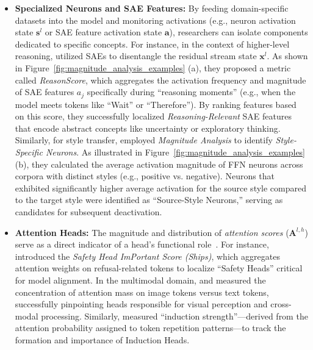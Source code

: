 \documentclass[11pt,letterpaper]{mystyle}
\begin{document}
\begin{itemize}[leftmargin=*]
    \item \textbf{Specialized Neurons and SAE Features:} By feeding domain-specific datasets into the model and monitoring activations (e.g., neuron activation state $\mathbf{s}^l$ or SAE feature activation state $\mathbf{a}$), researchers can isolate components dedicated to specific concepts.
    For instance, in the context of higher-level reasoning, \citet{galichin2025have} utilized SAEs to disentangle the residual stream state $\mathbf{x}^l$. 
    As shown in Figure~\ref{fig:magnitude_analysis_examples} (a), they proposed a metric called \textit{ReasonScore}, which aggregates the activation frequency and magnitude of SAE features $a_j$ specifically during ``reasoning moments'' (e.g., when the model meets tokens like ``Wait'' or ``Therefore''). 
    By ranking features based on this score, they successfully localized \textit{Reasoning-Relevant} SAE features that encode abstract concepts like uncertainty or exploratory thinking.
    Similarly, for style transfer, \citet{lai-etal-2024-style} employed \textit{Magnitude Analysis} to identify \textit{Style-Specific Neurons}. As illustrated in Figure~\ref{fig:magnitude_analysis_examples} (b), they calculated the average activation magnitude of FFN neurons across corpora with distinct styles (e.g., positive vs. negative). Neurons that exhibited significantly higher average activation for the source style compared to the target style were identified as ``Source-Style Neurons,'' serving as candidates for subsequent deactivation.

    \item \textbf{Attention Heads:} The magnitude and distribution of \textit{attention scores} ($\mathbf{A}^{l,h}$) serve as a direct indicator of a head's functional role~\citep{xiao2023streamingllm,cancedda2024spectral,singh2024needs,wang2024transformers,bi2025unveiling,zhou2025roleattentionheadslarge,sergeev2025optimizingmultimodallanguagemodels}.
    For instance, \citet{zhou2025roleattentionheadslarge} introduced the \textit{Safety Head ImPortant Score (Ships)}, which aggregates attention weights on refusal-related tokens to localize ``Safety Heads'' critical for model alignment.
    In the multimodal domain, \citet{sergeev2025optimizingmultimodallanguagemodels} and \citet{bi2025unveiling} measured the concentration of attention mass on image tokens versus text tokens, successfully pinpointing heads responsible for visual perception and cross-modal processing.
    Similarly, \citet{singh2024needs} measured ``induction strength''---derived from the attention probability assigned to token repetition patterns---to track the formation and importance of Induction Heads.
\end{itemize}
\end{document}
